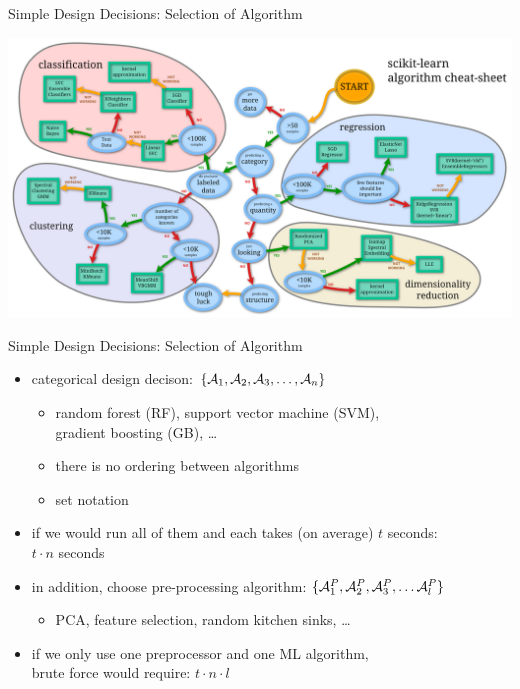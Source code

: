 \begin{frame}[c]{Simple Design Decisions: Selection of Algorithm}

\includegraphics[width=1.0\textwidth]{images/sklearn-cheat}


\end{frame}
\begin{frame}[c]{Simple Design Decisions: Selection of Algorithm}

\begin{itemize}
  \item categorical design decison: $\{ \mathcal{A}_1, \mathcal{A}_2, \mathcal{A}_3, \ldots, \mathcal{A}_n\}$
  \begin{itemize}
	\item random forest (RF), support vector machine (SVM),\\ gradient boosting (GB), \ldots
    \item there is no ordering between algorithms
    \item set notation
  \end{itemize}
  \pause
  \item if we would run all of them and each takes (on average) $t$ seconds:\\
  $t \cdot n$ seconds
  \pause
  \smallskip
  \item in addition, choose pre-processing algorithm: $\{\mathcal{A}_1^P, \mathcal{A}_2^P, \mathcal{A}_3^P, \ldots \mathcal{A}_l^P \}$
  \begin{itemize}
    \item PCA, feature selection, random kitchen sinks, \ldots
  \end{itemize}
  \item if we only use one preprocessor and one ML algorithm,\\ brute force would require:
  $t \cdot n \cdot l$
\end{itemize}

\end{frame}
